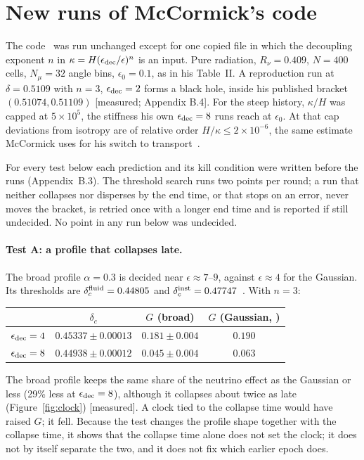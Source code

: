 \documentclass[11pt]{article}
\newcommand{\grade}[1]{\textsf{\small[#1]}}
\begin{document}
\section{New runs of McCormick's code}\label{sec:runs}

The code~\cite{McCcode} was run unchanged except for one copied file in which the decoupling exponent $n$ in $\kappa=H(\epsilon_{\rm dec}/\epsilon)^n$ is an input. Pure radiation, $R_\nu=0.409$, $N=400$ cells, $N_\mu=32$ angle bins, $\epsilon_0=0.1$, as in his Table~II. A reproduction run at $\delta=0.5109$ with $n=3$, $\epsilon_{\rm dec}=2$ forms a black hole, inside his published bracket $(0.51074,0.51109)$ \grade{measured; Appendix B.4}. For the steep history, $\kappa/H$ was capped at $5\times10^5$, the stiffness his own $\epsilon_{\rm dec}=8$ runs reach at $\epsilon_0$. At that cap deviations from isotropy are of relative order $H/\kappa\le2\times10^{-6}$, the same estimate McCormick uses for his switch to transport~\cite[Sec.~III]{McC}.

For every test below each prediction and its kill condition were written before the runs (Appendix~B.3). The threshold search runs two points per round; a run that neither collapses nor disperses by the end time, or that stops on an error, never moves the bracket, is retried once with a longer end time and is reported if still undecided. No point in any run below was undecided.

\paragraph{Test A: a profile that collapses late.} The broad profile $\alpha=0.3$ is decided near $\epsilon\approx7$--$9$, against $\epsilon\approx4$ for the Gaussian. Its thresholds are $\delta_c^{\rm fluid}=0.44805$ and $\delta_c^{\rm inst}=0.47747$~\cite{McCcode}. With $n=3$:
\begin{center}\begin{tabular}{lccc}\toprule
& $\delta_c$ & $G$ (broad) & $G$ (Gaussian, \cite{McC}) \\\midrule
$\epsilon_{\rm dec}=4$ & $0.45337\pm0.00013$ & $0.181\pm0.004$ & $0.190$\\
$\epsilon_{\rm dec}=8$ & $0.44938\pm0.00012$ & $0.045\pm0.004$ & $0.063$\\\bottomrule\end{tabular}\end{center}
The broad profile keeps the same share of the neutrino effect as the Gaussian or less (29\% less at $\epsilon_{\rm dec}=8$), although it collapses about twice as late (Figure~\ref{fig:clock}) \grade{measured}. A clock tied to the collapse time would have raised $G$; it fell. Because the test changes the profile shape together with the collapse time, it shows that the collapse time alone does not set the clock; it does not by itself separate the two, and it does not fix which earlier epoch does.
\end{document}
